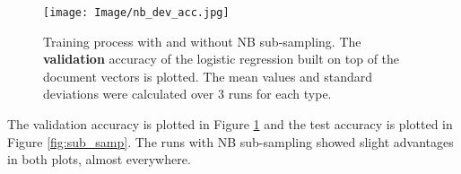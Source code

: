 \documentclass[11pt]{article}
\begin{document}
\begin{figure}[h] \centering \texttt{[image: Image/nb\_dev\_acc.jpg]}
    \caption{Training process with and without NB sub-sampling. The \textbf{validation} accuracy of the logistic regression built on top of the document vectors is plotted. The mean values and standard deviations were calculated over 3 runs for each type.}
    \label{fig:sub_samp_dev}
\end{figure}

The validation accuracy is plotted in Figure \ref{fig:sub_samp_dev} and the test accuracy is plotted in Figure \ref{fig:sub_samp}. The runs with NB sub-sampling showed slight advantages in both plots, almost everywhere.
\end{document}
